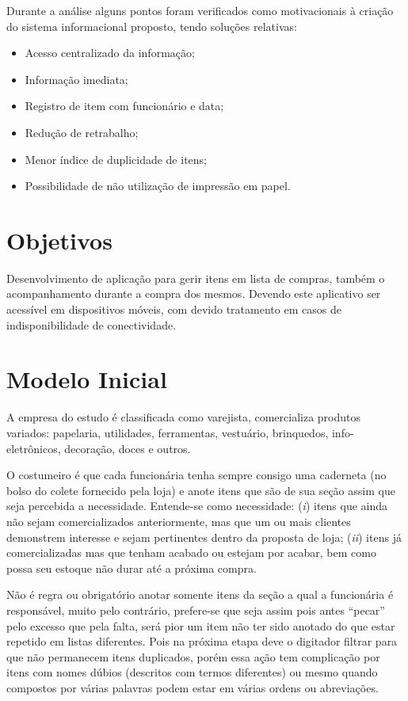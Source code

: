 \documentclass[12pt]{article}
\begin{document}
Durante a análise alguns pontos foram verificados como motivacionais à criação do sistema informacional proposto, tendo soluções relativas:

\begin{itemize}
\item Acesso centralizado da informação;
\item Informação imediata;
\item Registro de item com funcionário e data;
\item Redução de retrabalho;
\item Menor índice de duplicidade de itens;
\item Possibilidade de não utilização de impressão em papel.
\end{itemize}

\section{Objetivos}

Desenvolvimento de aplicação para gerir itens em lista de compras, também o acompanhamento durante a compra dos mesmos. Devendo este aplicativo ser acessível em dispositivos móveis, com devido tratamento em casos de indisponibilidade de conectividade.

\section{Modelo Inicial}

A empresa do estudo é classificada como varejista, comercializa produtos variados: papelaria, utilidades, ferramentas, vestuário, brinquedos, info-eletrônicos, decoração, doces e outros.

O costumeiro é que cada funcionária tenha sempre consigo uma caderneta (no bolso do colete fornecido pela loja) e anote itens que são de sua seção assim que seja percebida a necessidade. Entende-se como necessidade: (\textit{i}) itens que ainda não sejam comercializados anteriormente, mas que um ou mais clientes demonstrem interesse e sejam pertinentes dentro da proposta de loja; (\textit{ii}) itens já comercializadas mas que tenham acabado ou estejam por acabar, bem como possa seu estoque não durar até a próxima compra.

Não é regra ou obrigatório anotar somente itens da seção a qual a funcionária é responsável, muito pelo contrário, prefere-se que seja assim pois antes ``pecar'' pelo excesso que pela falta, será pior um item não ter sido anotado do que estar repetido em listas diferentes. Pois na próxima etapa deve o digitador filtrar para que não permanecem itens duplicados, porém essa ação tem complicação por itens com nomes dúbios (descritos com termos diferentes) ou mesmo quando compostos por várias palavras podem estar em várias ordens ou abreviações.
\end{document}
